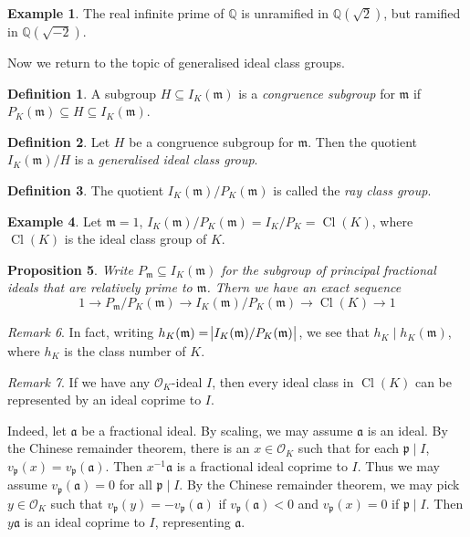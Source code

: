 \documentclass[11pt]{article}
\theoremstyle{definition}
\newtheorem{definition}{Definition}[section]
\newtheorem{example}[definition]{Example}
\newtheorem*{example*}{Example}
\theoremstyle{plain}
\newtheorem{proposition}[definition]{Proposition}
\theoremstyle{remark}
\newtheorem{remark}[definition]{Remark}
\DeclareMathOperator{\Cl}{Cl}
\newcommand{\QQ}{\mathbb{Q}}
\newcommand{\cO}{\mathcal{O}}
\newcommand{\fa}{\mathfrak{a}}
\newcommand{\fp}{\mathfrak{p}}
\newcommand{\fm}{\mathfrak{m}}
\begin{document}
\begin{example*}
    The real infinite prime of $\QQ$ is unramified in $\QQ(\sqrt{2})$, but ramified in $\QQ(\sqrt{-2})$.
\end{example*}

\noindent Now we return to the topic of generalised ideal class groups.

\begin{definition}\label{def:2_17}
    A subgroup $H \subseteq I_K(\fm)$ is a \emph{congruence subgroup} for $\fm$ if $P_K(\fm) \subseteq H \subseteq I_K(\fm)$.
\end{definition}

\begin{definition}\label{def:2_18}
    Let $H$ be a congruence subgroup for $\fm$. Then the quotient $I_K(\fm)/H$ is a \emph{generalised ideal class group}.
\end{definition}

\begin{definition}\label{def:2_19}
    The quotient $I_K(\fm)/P_K(\fm)$ is called the \emph{ray class group}.
\end{definition}

\begin{example}\label{eg:2_20}
    Let $\fm = 1$, $I_K(\fm)/P_K(\fm) = I_K/P_K = \Cl(K)$, where $\Cl(K)$ is the ideal class group of $K$.
\end{example}

\begin{proposition}\label{prop:2_21}
    Write $P_\fm \subseteq I_K(\fm)$ for the subgroup of principal fractional ideals that are relatively prime to $\fm$. Thern we have an exact sequence
    \begin{equation*}
        1 \longrightarrow P_\fm/P_K(\fm) \longrightarrow I_K(\fm)/P_K(\fm) \longrightarrow \Cl(K) \longrightarrow 1
    \end{equation*}
\end{proposition}

\begin{remark}\label{rem:2_22}
    In fact, writing $h_K(\fm) = \abs{I_K(\fm)/P_K(\fm)}$, we see that $h_K \mid h_K(\fm)$, where $h_K$ is the class number of $K$.
\end{remark}

\begin{remark}\label{rem:2_23}
    If we have any $\cO_K$-ideal $I$, then every ideal class in $\Cl(K)$ can be represented by an ideal coprime to $I$.

    {\color{blue}
        Indeed, let $\fa$ be a fractional ideal. By scaling, we may assume $\fa$ is an ideal. By the Chinese remainder theorem, there is an $x \in \cO_K$ such that for each $\fp \mid I$, $v_\fp(x) = v_\fp(\fa)$. Then $x^{-1} \fa$ is a fractional ideal coprime to $I$. Thus we may assume $v_\fp(\fa) = 0$ for all $\fp \mid I$. By the Chinese remainder theorem, we may pick $y \in \cO_K$ such that $v_\fp(y) = -v_\fp(\fa)$ if $v_\fp(\fa) < 0$ and $v_\fp(x) = 0$ if $\fp \mid I$. Then $y \fa$ is an ideal coprime to $I$, representing $\fa$.
    }
\end{remark}
\end{document}

